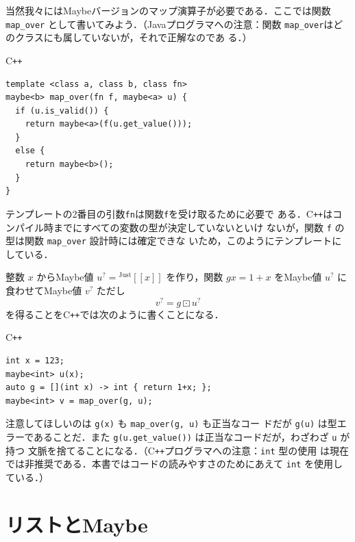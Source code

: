 \documentclass[a5paper,twoside,fleqn,draft]{jsbook}
\def\[{\left[\!\left[}
\def\]{\right]\!\right]}
\newcommand{\programminglanguage}[1]{\textsf{#1}}
\newcommand{\cxx}{\programminglanguage{C}\texttt{++}}
\newcommand{\cxxzerothree}{\cxx\programminglanguage{03}}
\newcommand{\java}{\programminglanguage{Java}}
\newcommand{\code}[1]{\texttt{#1}}
\newenvironment{cxxcode}{\begin{itembox}[r]{\cxx}}{\end{itembox}}
\DeclareMathOperator{\mMapMaybe}{\boxdot}
\newcommand{\mValueConstructor}[1]{\mathrm{#1}}
\newcommand{\mGenericValueAssemble}[2]{{}^\mValueConstructor{#1}\[#2\]}
\newcommand{\mJustWith}[1]{\mGenericValueAssemble{Just}{#1}}
\newcommand{\mMaybe}[1]{{#1}^?}
\begin{document}
当然我々にはMaybeバージョンのマップ演算子が必要である．ここでは関数
\code{map\_over} として書いてみよう．（\java プログラマへの注意：関数
  \code{map\_over}はどのクラスにも属していないが，それで正解なのであ
  る．）
\begin{cxxcode}
\begin{verbatim}
template <class a, class b, class fn>
maybe<b> map_over(fn f, maybe<a> u) {
  if (u.is_valid()) {
    return maybe<a>(f(u.get_value()));
  }
  else {
    return maybe<b>();
  }
}
\end{verbatim}
\end{cxxcode}
テンプレートの2番目の引数\code{fn}は関数\code{f}を受け取るために必要で
ある．\cxx はコンパイル時までにすべての変数の型が決定していないといけ
ないが，関数 \code{f} の型は関数 \code{map\_over} 設計時には確定できな
いため，このようにテンプレートにしている．

整数 $x$ からMaybe値 $\mMaybe{u}=\mJustWith{x}$ を作り，関数 $gx=1+x$
をMaybe値 $\mMaybe{u}$ に食わせてMaybe値 $\mMaybe{v}$ ただし
\begin{equation}
\mMaybe{v}=g\mMapMaybe\mMaybe{u}
\end{equation}
を得ることを\cxx では次のように書くことになる．
\begin{cxxcode}
\begin{verbatim}
int x = 123;
maybe<int> u(x);
auto g = [](int x) -> int { return 1+x; };
maybe<int> v = map_over(g, u);
\end{verbatim}
\end{cxxcode}
注意してほしいのは \code{g(x)} も \code{map\_over(g, u)} も正当なコー
ドだが \code{g(u)} は型エラーであることだ．また
\code{g(u.get\_value())} は正当なコードだが，わざわざ \code{u} が持つ
文脈を捨てることになる．（\cxx プログラマへの注意：\code{int} 型の使用
は現在では非推奨である．本書ではコードの読みやすさのためにあえて
\code{int} を使用している．）


\section{リストとMaybe}
\end{document}
